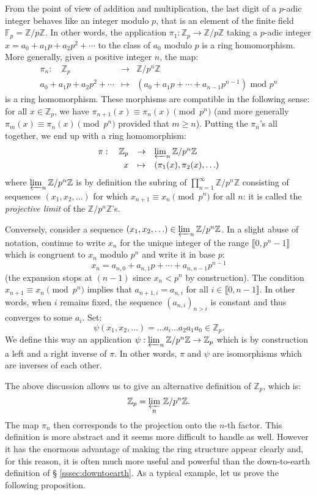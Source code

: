 \documentclass[11pt]{article}
\numberwithin{equation}{section}
\numberwithin{figure}{section}
\renewcommand{\geq}{\geqslant}
\theoremstyle{definition}
\newcommand{\Z}{\mathbb Z}
\newcommand{\F}{\mathbb F}
\newcommand{\Fp}{\F_p}
\begin{document}
From the point of view of addition and multiplication, the last 
digit of a $p$-adic integer behaves like an integer modulo $p$, that is 
an element of the finite field $\Fp = \Z/p\Z$.
In other words, the application $\pi_1 : \Z_p \to \Z/p\Z$ taking a 
$p$-adic integer $x = a_0 + a_1 p + a_2 p^2 + \cdots$ to the class of 
$a_0$ modulo $p$ is a ring homomorphism.
More generally, given a positive integer $n$, the map:
$$\begin{array}{rcl}
\pi_n :\quad \Z_p & \to & \Z/p^n\Z \\
a_0 + a_1 p + a_2 p^2 + \cdots & \mapsto &
(a_0 + a_1 p + \cdots + a_{n-1} p^{n-1}) \text{ mod } p^n
\end{array}$$
is a ring homomorphism. These morphisms are compatible in the following 
sense: for all $x \in \Z_p$, we have $\pi_{n+1}(x) \equiv \pi_n(x) 
\pmod{p^n}$ (and more generally $\pi_m(x) \equiv \pi_n(x) \pmod{p^n}$ 
provided that $m \geq n$). Putting the $\pi_n$'s all together, we end
up with a ring homomorphism:
$$\begin{array}{rcl}
\pi: \quad \Z_p & \to & \varprojlim_n \Z/p^n\Z \smallskip \\
x & \mapsto & (\pi_1(x), \pi_2(x), \ldots)
\end{array}$$
where $\varprojlim_n \Z/p^n\Z$ is by definition the subring of 
$\prod_{n=1}^\infty \Z/p^n\Z$ consisting of sequences $(x_1, x_2,
\ldots)$ for which $x_{n+1} \equiv x_n \pmod{p^n}$ for all $n$: it
is called the \emph{projective limit} of the $\Z/p^n\Z$'s.

Conversely, consider a sequence $(x_1, x_2, \ldots) \in \varprojlim_n 
\Z/p^n\Z$. In a slight abuse of notation, continue to write $x_n$ for 
the unique integer of the range $\llbracket 0, p^n{-}1 \rrbracket$ 
which is congruent to 
$x_n$ modulo $p^n$ and write it in base $p$:
$$x_n = a_{n,0} + a_{n,1} p + \cdots + a_{n,n-1} p^{n-1}$$
(the expansion stops at $(n{-}1)$ since $x_n < p^n$ by construction).
The condition $x_{n+1} \equiv x_n \pmod{p^n}$ implies that 
$a_{n+1,i} = a_{n,i}$ for all $i \in \llbracket 0, n{-}1\rrbracket$.
In other words, when $i$ remains fixed, the sequence $(a_{n,i})_{n > i}$ 
is constant and thus converges to some $a_i$. Set:
$$\psi(x_1, x_2, \ldots) = \ldots a_i \ldots a_2 a_1 a_0 \in \Z_p.$$
We define this way an application $\psi : \varprojlim_n \Z/p^n\Z \to 
\Z_p$ which is by construction a left and a right inverse of $\pi$. In
other words, $\pi$ and $\psi$ are isomorphisms which are inverses of
each other.

The above discussion allows us to give an alternative definition of 
$\Z_p$, which is:
$$\Z_p = \varprojlim_n \, \Z/p^n\Z.$$
The map $\pi_n$ then corresponds to the projection onto the $n$-th factor.
This definition is more abstract and it seems more difficult to 
handle as well. However it has the enormous advantage of making the ring 
structure appear clearly and, for this reason, it is often much more
useful and powerful than the down-to-earth definition of \S 
\ref{sssec:downtoearth}.
As a typical example, let us prove the following proposition.
\end{document}
